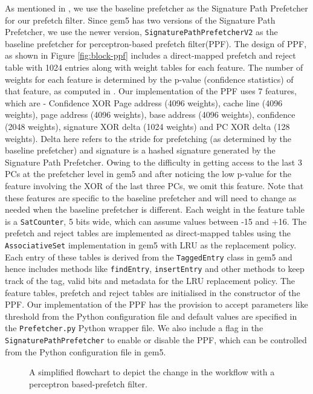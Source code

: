 \documentclass[10pt,conference]{IEEEtran}
\begin{document}
As mentioned in \cite{ppf}, we use the baseline prefetcher as the Signature Path Prefetcher for our prefetch filter. Since gem5 has two versions of the Signature Path Prefetcher, we use the newer version, \texttt{SignaturePathPrefetcherV2} as the baseline prefetcher for perceptron-based prefetch filter(PPF). The design of PPF, as shown in Figure \ref{fig:block-ppf} includes a direct-mapped prefetch and reject table with 1024 entries along with weight tables for each feature. The number of weights for each feature is determined by the p-value (confidence statistics) of that feature, as computed in \cite{ppf}. Our implementation of the PPF uses 7 features, which are - Confidence XOR Page address (4096 weights), cache line (4096 weights), page address (4096 weights), base address (4096 weights), confidence (2048 weights), signature XOR delta (1024 weights) and PC XOR delta (128 weights). Delta here refers to the stride for prefetching (as determined by the baseline prefetcher) and signature is a hashed signature generated by the Signature Path Prefetcher. Owing to the difficulty in getting access to the last 3 PCs at the prefetcher level in gem5 and after noticing the low p-value for the feature involving the XOR of the last three PCs, we omit this feature. Note that these features are specific to the baseline prefetcher and will need to change as needed when the baseline prefetcher is different. Each weight in the feature table is a \texttt{SatCounter}, 5 bits wide, which can assume values between -15 and +16. The prefetch and reject tables are implemented as direct-mapped tables using the \texttt{AssociativeSet} implementation in gem5 with LRU as the replacement policy. Each entry of these tables is derived from the \texttt{TaggedEntry} class in gem5 and hence includes methods like \texttt{findEntry}, \texttt{insertEntry} and other methods to keep track of the tag, valid bits and metadata for the LRU replacement policy. The feature tables, prefetch and reject tables are initialised in the constructor of the PPF. Our implementation of the PPF has the provision to accept parameters like threshold from the Python configuration file and default values are specified in the \texttt{Prefetcher.py} Python wrapper file. We also include a flag in the \texttt{SignaturePathPrefetcher} to enable or disable the PPF, which can be controlled from the Python configuration file in gem5. 

\begin{figure}
    \centering
    \caption{A simplified flowchart to depict the change in the workflow with a perceptron based-prefetch filter.}
    \label{fig:flowchart-ppf}
\end{figure}
\end{document}
